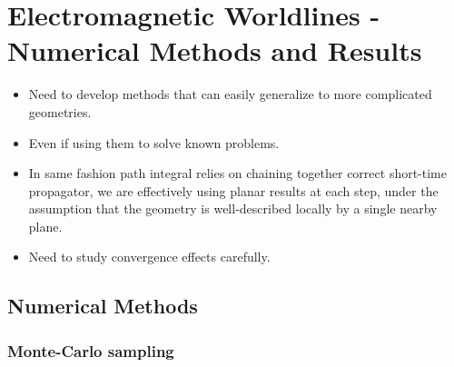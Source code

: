 \chapter{Electromagnetic Worldlines - Numerical Methods and Results}
\label{ch:numerical}
\begin{itemize}
\item Need to develop methods that can easily generalize to more complicated geometries.
\item Even if using them to solve known problems.
\item In same fashion path integral relies on chaining together correct short-time propagator, we 
  are effectively using planar results at each step, under the assumption that the geometry
    is well-described locally by a single nearby plane.  
\item Need to study convergence effects carefully.  
\end{itemize}

\section{Numerical Methods}



\subsection{Monte-Carlo sampling}

